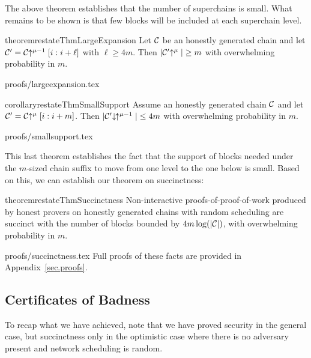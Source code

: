 The above theorem establishes that the number of superchains is small. What
remains to be shown is that few blocks will be included at each superchain
level.

\begin{restatable}{theorem}{restateThmLargeExpansion}
    \label{thm.large-expansion}
    Let $\mathcal{C}$ be an honestly generated chain and let
    $\mathcal{C}' = \mathcal{C}\negthickspace\uparrow^{\mu - 1}[i:i + \ell]$ with $\ell \geq 4m$.
    Then $|\mathcal{C}'\negthickspace\uparrow^\mu| \geq m$
    with overwhelming probability in $m$.
\end{restatable}

\ifonecolumn
{proofs/largeexpansion.tex}
\fi

\begin{restatable}{corollary}{restateThmSmallSupport}
    \label{crly.small-support}
    Assume an honestly generated chain $\mathcal{C}$ and let $\mathcal{C}' = \mathcal{C}\negthickspace\uparrow^\mu[i:i + m]$. Then
    $|\mathcal{C}'\negthickspace\downarrow\,\negthickspace\uparrow^{\mu - 1}| \leq 4m$
    with overwhelming probability in $m$.
\end{restatable}

\ifonecolumn
{proofs/smallsupport.tex}
\fi

This last theorem establishes the fact that the support of blocks needed under
the $m$-sized chain suffix to move from one level to the one below is small.
Based on this, we can establish our theorem on succinctness:

\begin{restatable}{theorem}{restateThmSuccinctness}
    \label{thm.succinctness}
    Non-interactive proofs-of-proof-of-work produced by honest provers on
    honestly generated chains with random scheduling are succinct with the
    number of blocks bounded by $4m \log(|\mathcal{C}|)$, with overwhelming
    probability in $m$.
\end{restatable}

\ifonecolumn
{proofs/succinctness.tex}
\else
Full proofs of these facts are provided in Appendix~\ref{sec.proofs}.
\fi

\subsection{Certificates of Badness}
To recap what we have achieved, note that we have proved security in the general
case, but succinctness only in the optimistic case where there is no adversary
present and network scheduling is random.

